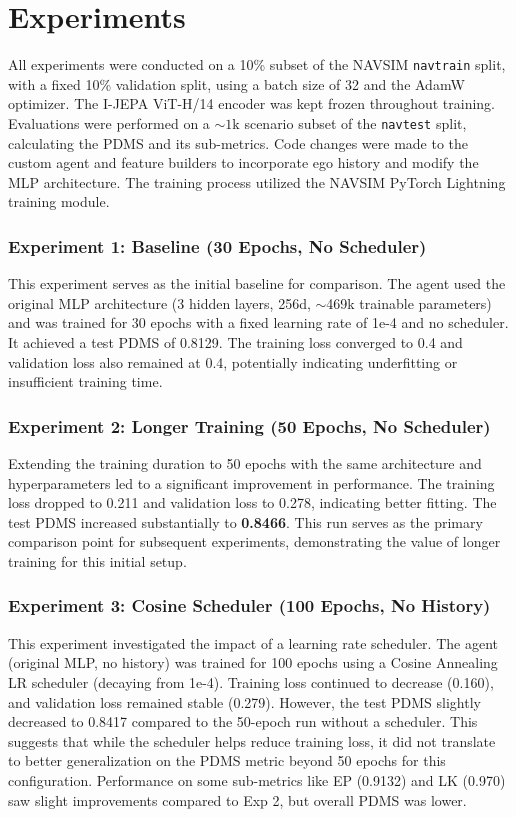 \documentclass{article}
\begin{document}

\section{Experiments}
\label{sec:experiments}
All experiments were conducted on a 10\% subset of the NAVSIM \texttt{navtrain} split, with a fixed 10\% validation split, using a batch size of 32 and the AdamW optimizer. The I-JEPA ViT-H/14 encoder was kept frozen throughout training. Evaluations were performed on a \(\sim\text{1k}\) scenario subset of the \texttt{navtest} split, calculating the PDMS and its sub-metrics. Code changes were made to the custom agent and feature builders to incorporate ego history and modify the MLP architecture. The training process utilized the NAVSIM PyTorch Lightning training module.
\subsubsection*{Experiment 1: Baseline (30 Epochs, No Scheduler)}
This experiment serves as the initial baseline for comparison. The agent used the original MLP architecture (3 hidden layers, 256d, $\sim$469k trainable parameters) and was trained for 30 epochs with a fixed learning rate of 1e-4 and no scheduler. It achieved a test PDMS of 0.8129. The training loss converged to 0.4 and validation loss also remained at 0.4, potentially indicating underfitting or insufficient training time.
\subsubsection*{Experiment 2: Longer Training (50 Epochs, No Scheduler)}
Extending the training duration to 50 epochs with the same architecture and hyperparameters led to a significant improvement in performance. The training loss dropped to 0.211 and validation loss to 0.278, indicating better fitting. The test PDMS increased substantially to \textbf{0.8466}. This run serves as the primary comparison point for subsequent experiments, demonstrating the value of longer training for this initial setup.
\subsubsection*{Experiment 3: Cosine Scheduler (100 Epochs, No History)}
This experiment investigated the impact of a learning rate scheduler. The agent (original MLP, no history) was trained for 100 epochs using a Cosine Annealing LR scheduler (decaying from 1e-4). Training loss continued to decrease (0.160), and validation loss remained stable (0.279). However, the test PDMS slightly decreased to 0.8417 compared to the 50-epoch run without a scheduler. This suggests that while the scheduler helps reduce training loss, it did not translate to better generalization on the PDMS metric beyond 50 epochs for this configuration. Performance on some sub-metrics like EP (0.9132) and LK (0.970) saw slight improvements compared to Exp 2, but overall PDMS was lower.
\end{document}
